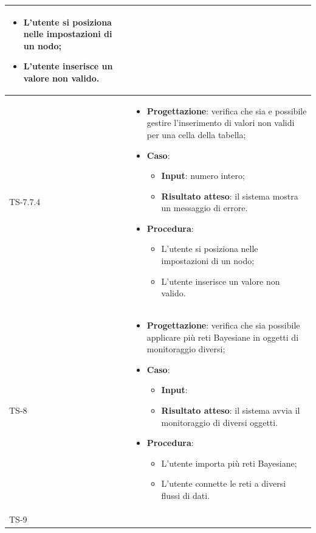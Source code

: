 \begin{longtable}{|C{2.5cm}|C{13cm}|}
\begin{itemize}
	\begin{itemize}
		\item L'utente si posiziona nelle impostazioni di un nodo;
		\item L'utente inserisce un valore non valido.
	\end{itemize} 
\end{itemize}
	 \\
	\hline
	{TS-7.7.4} & 
\begin{itemize}
	\item \textbf{Progettazione}: verifica che sia e possibile gestire
	l'inserimento di valori non validi per una cella della tabella;
	\item \textbf{Caso}: 
	\begin{itemize}
		\item \textbf{Input}: numero intero;
		\item \textbf{Risultato atteso}: il sistema mostra un messaggio di errore.
	\end{itemize}
\item \textbf{Procedura}:
\begin{itemize}
\item L'utente si posiziona nelle impostazioni di un nodo;
\item L'utente inserisce un valore non valido.
\end{itemize} 
\end{itemize}
\\
\hline
	{TS-8} & 
\begin{itemize}
	\item \textbf{Progettazione}: verifica che sia possibile applicare più reti
	Bayesiane in oggetti di monitoraggio diversi;
	\item \textbf{Caso}: 
	\begin{itemize}
		\item \textbf{Input}: 
		\item \textbf{Risultato atteso}: il sistema avvia il monitoraggio di diversi oggetti.
	\end{itemize}
	\item \textbf{Procedura}:
	\begin{itemize}
		\item L'utente importa più reti Bayesiane;
		\item L'utente connette le reti a diversi flussi di dati.
	\end{itemize} 
\end{itemize} \\
\hline
	{TS-9} &
\begin{itemize}

\end{itemize}
\end{longtable}
